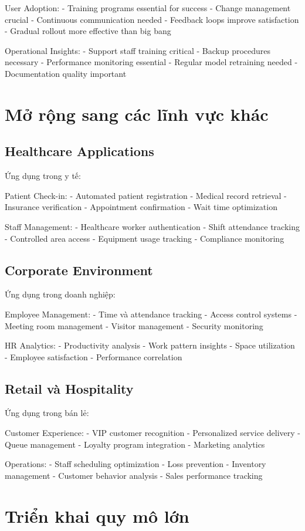 \documentclass[12pt,a4paper]{report}
\begin{document}
User Adoption:
- Training programs essential for success
- Change management crucial
- Continuous communication needed
- Feedback loops improve satisfaction
- Gradual rollout more effective than big bang

Operational Insights:
- Support staff training critical
- Backup procedures necessary
- Performance monitoring essential
- Regular model retraining needed
- Documentation quality important

\section{Mở rộng sang các lĩnh vực khác}
\subsection{Healthcare Applications}
Ứng dụng trong y tế:

Patient Check-in:
- Automated patient registration
- Medical record retrieval
- Insurance verification
- Appointment confirmation
- Wait time optimization

Staff Management:
- Healthcare worker authentication
- Shift attendance tracking
- Controlled area access
- Equipment usage tracking
- Compliance monitoring

\subsection{Corporate Environment}
Ứng dụng trong doanh nghiệp:

Employee Management:
- Time và attendance tracking
- Access control systems
- Meeting room management
- Visitor management
- Security monitoring

HR Analytics:
- Productivity analysis
- Work pattern insights
- Space utilization
- Employee satisfaction
- Performance correlation

\subsection{Retail và Hospitality}
Ứng dụng trong bán lẻ:

Customer Experience:
- VIP customer recognition
- Personalized service delivery
- Queue management
- Loyalty program integration
- Marketing analytics

Operations:
- Staff scheduling optimization
- Loss prevention
- Inventory management
- Customer behavior analysis
- Sales performance tracking

\section{Triển khai quy mô lớn}
\end{document}
